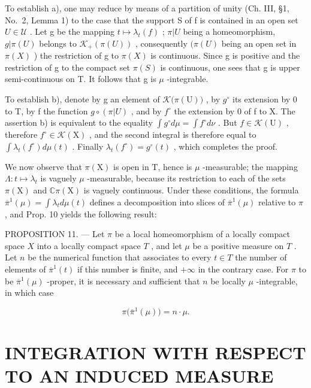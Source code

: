 To establish a), one may reduce by means of a partition of unity (Ch. III, §1, No.~2, Lemma 1) to the case that the support S of f is contained in an open set \(U \in \mathcal{U}\) . Let g be the mapping \(t \mapsto \lambda_{t}(f)\) ; \(\pi|U\) being a homeomorphism, \(g|\pi(U)\) belongs to \(\mathcal{K}_{+}(\pi(U))\) , consequently \((\pi(U)\) being an open set in \(\pi(X)\) ) the restriction of g to \(\pi(X)\) is continuous. Since g is positive and the restriction of g to the compact set \(\pi(S)\) is continuous, one sees that g is upper semi-continuous on T. It follows that g is \(\mu\) -integrable.

To establish b), denote by g an element of \(\mathcal{K}\big(\pi(\mathrm{U})\big)\) , by \(g^{\circ}\) its extension by 0 to T, by f the function \(g \circ (\pi|U)\) , and by \(f^{\circ}\) the extension by 0 of f to X. The assertion b) is equivalent to the equality \(\int g^{\circ} d\mu = \int f^{\circ} d\nu\) . But \(f \in \mathcal{K}(\mathrm{U})\) , therefore \(f^{\circ} \in \mathcal{K}(\mathrm{X})\) , and the second integral is therefore equal to \(\int \lambda_{t}(f^{\circ}) d\mu(t)\) . Finally \(\lambda_{t}(f^{\circ}) = g^{\circ}(t)\) , which completes the proof.

We now observe that \(\pi(\mathrm{X})\) is open in T, hence is \(\mu\) -measurable; the mapping \(\Lambda: t \mapsto \lambda_t\) is vaguely \(\mu\) -measurable, because its restriction to each of the sets \(\pi(\mathrm{X})\) and \(\mathbb{C}\pi(\mathrm{X})\) is vaguely continuous. Under these conditions, the formula \(\overline{\pi}^{1}(\mu) = \int \lambda_t d\mu(t)\) defines a decomposition into slices of \(\overline{\pi}^{1}(\mu)\) relative to \(\pi\) , and Prop. 10 yields the following result:

PROPOSITION 11. --- Let \(\pi\) be a local homeomorphism of a locally compact space \(X\) into a locally compact space \(T\) , and let \(\mu\) be a positive measure on \(T\) . Let \(n\) be the numerical function that associates to every \(t \in T\) the number of elements of \(\overline{\pi}^{1}(t)\) if this number is finite, and \(+\infty\) in the contrary case. For \(\pi\) to be \(\overline{\pi}^{1}(\mu)\) -proper, it is necessary and sufficient that \(n\) be locally \(\mu\) -integrable, in which case

\[
\pi \big (\bar {\pi} ^ {1} (\mu) \big) = n \cdot \mu .\tag{15}
\]

\section{INTEGRATION WITH RESPECT TO AN INDUCED MEASURE}

